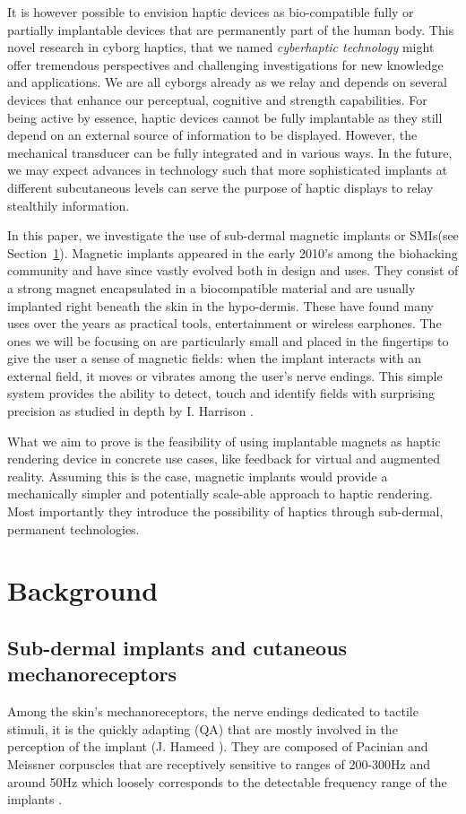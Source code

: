 \documentclass[10pt,journal,compsoc]{IEEEtran}
\begin{document}
It is however possible to envision haptic devices as bio-compatible fully or partially implantable devices that are permanently part of the human body. This novel research in cyborg haptics, that we named \emph{cyberhaptic technology} might offer tremendous perspectives and challenging investigations for new knowledge and applications. We are all cyborgs already as we relay and depends on several devices that enhance our perceptual, cognitive and strength capabilities. For being active by essence, haptic devices cannot be fully implantable as they still depend on an external source of information to be displayed. However, the mechanical transducer can be fully integrated and in various ways. In the future, we may expect advances in technology such that more sophisticated implants at different subcutaneous levels can serve the purpose of haptic displays to relay stealthily information. 

In this paper, we investigate the use of sub-dermal magnetic implants or SMIs(see Section~\ref{sec:background}). Magnetic implants appeared in the early 2010's among the biohacking community and have since vastly evolved both in design and uses. They consist of a strong magnet encapsulated in a biocompatible material and are usually implanted right beneath the skin in the hypo-dermis. These have found many uses over the years as practical tools, entertainment or wireless earphones. The ones we will be focusing on are particularly small and placed in the fingertips to give the user a sense of magnetic fields: when the implant interacts with an external field, it moves or vibrates among the user's nerve endings. This simple system provides the ability to detect, touch and identify fields with surprising precision as studied in depth by I. Harrison \cite{harrison2018tf}.

What we aim to prove is the feasibility of using implantable magnets as haptic rendering device in concrete use cases, like feedback for virtual and augmented reality. Assuming this is the case, magnetic implants would provide a mechanically simpler and potentially scale-able approach to haptic rendering. Most importantly they introduce the possibility of haptics through sub-dermal, permanent technologies.



\section{Background}
\label{sec:background}
\subsection{Sub-dermal implants and cutaneous mechanoreceptors}
Among the skin's mechanoreceptors, the nerve endings dedicated to tactile stimuli, it is the quickly adapting (QA) that are mostly involved in the perception of the implant (J. Hameed \cite{hameed2010ieee}). They are composed of Pacinian and Meissner corpuscles that are receptively sensitive to ranges of 200-300Hz and around 50Hz which loosely corresponds to the detectable frequency range of the implants \cite{hameed2010ieee}.
\end{document}
